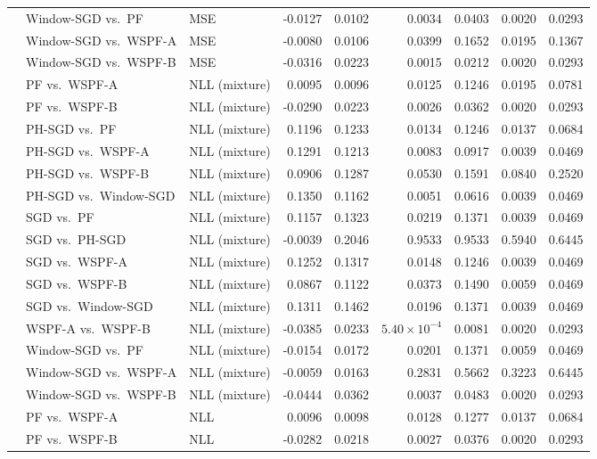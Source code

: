 {\begin{longtable}{@{}lllrrrrrr@{}}
 & Window-SGD vs.\ PF & MSE & -0.0127 & 0.0102 & 0.0034 & 0.0403 & 0.0020 & 0.0293 \\
 & Window-SGD vs.\ WSPF-A & MSE & -0.0080 & 0.0106 & 0.0399 & 0.1652 & 0.0195 & 0.1367 \\
 & Window-SGD vs.\ WSPF-B & MSE & -0.0316 & 0.0223 & 0.0015 & 0.0212 & 0.0020 & 0.0293 \\
 & PF vs.\ WSPF-A & NLL (mixture) & 0.0095 & 0.0096 & 0.0125 & 0.1246 & 0.0195 & 0.0781 \\
 & PF vs.\ WSPF-B & NLL (mixture) & -0.0290 & 0.0223 & 0.0026 & 0.0362 & 0.0020 & 0.0293 \\
 & PH-SGD vs.\ PF & NLL (mixture) & 0.1196 & 0.1233 & 0.0134 & 0.1246 & 0.0137 & 0.0684 \\
 & PH-SGD vs.\ WSPF-A & NLL (mixture) & 0.1291 & 0.1213 & 0.0083 & 0.0917 & 0.0039 & 0.0469 \\
 & PH-SGD vs.\ WSPF-B & NLL (mixture) & 0.0906 & 0.1287 & 0.0530 & 0.1591 & 0.0840 & 0.2520 \\
 & PH-SGD vs.\ Window-SGD & NLL (mixture) & 0.1350 & 0.1162 & 0.0051 & 0.0616 & 0.0039 & 0.0469 \\
 & SGD vs.\ PF & NLL (mixture) & 0.1157 & 0.1323 & 0.0219 & 0.1371 & 0.0039 & 0.0469 \\
 & SGD vs.\ PH-SGD & NLL (mixture) & -0.0039 & 0.2046 & 0.9533 & 0.9533 & 0.5940 & 0.6445 \\
 & SGD vs.\ WSPF-A & NLL (mixture) & 0.1252 & 0.1317 & 0.0148 & 0.1246 & 0.0039 & 0.0469 \\
 & SGD vs.\ WSPF-B & NLL (mixture) & 0.0867 & 0.1122 & 0.0373 & 0.1490 & 0.0059 & 0.0469 \\
 & SGD vs.\ Window-SGD & NLL (mixture) & 0.1311 & 0.1462 & 0.0196 & 0.1371 & 0.0039 & 0.0469 \\
 & WSPF-A vs.\ WSPF-B & NLL (mixture) & -0.0385 & 0.0233 & $5.40\times 10^{-4}$ & 0.0081 & 0.0020 & 0.0293 \\
 & Window-SGD vs.\ PF & NLL (mixture) & -0.0154 & 0.0172 & 0.0201 & 0.1371 & 0.0059 & 0.0469 \\
 & Window-SGD vs.\ WSPF-A & NLL (mixture) & -0.0059 & 0.0163 & 0.2831 & 0.5662 & 0.3223 & 0.6445 \\
 & Window-SGD vs.\ WSPF-B & NLL (mixture) & -0.0444 & 0.0362 & 0.0037 & 0.0483 & 0.0020 & 0.0293 \\
 & PF vs.\ WSPF-A & NLL & 0.0096 & 0.0098 & 0.0128 & 0.1277 & 0.0137 & 0.0684 \\
 & PF vs.\ WSPF-B & NLL & -0.0282 & 0.0218 & 0.0027 & 0.0376 & 0.0020 & 0.0293 \\

\end{longtable}}

